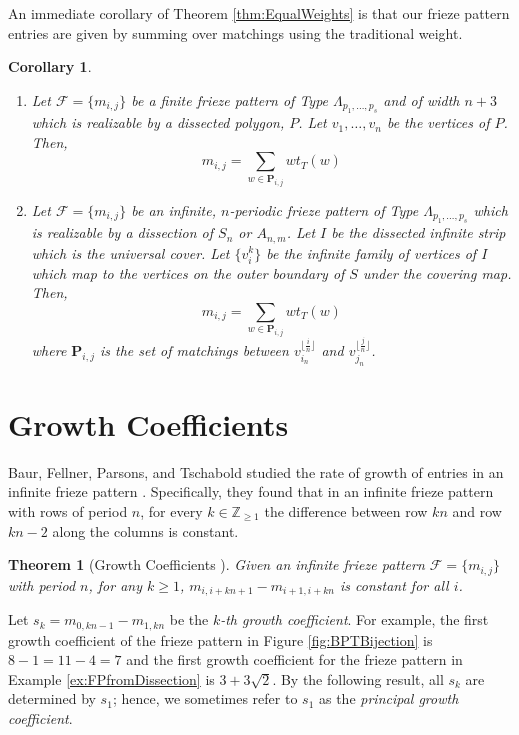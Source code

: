 \documentclass[12pt]{article}
\newtheorem{theorem}{Theorem}
\newtheorem{corollary}{Corollary}
\theoremstyle{remark}
\newcommand*{\pathset}[2]{\mathbf{P}_{#1,#2}}
\begin{document}
An immediate corollary of Theorem \ref{thm:EqualWeights} is that our frieze pattern entries are given by summing over matchings using the traditional weight.

\begin{corollary}\label{cor:TraditionalWeight}
\begin{enumerate}
    \item Let $\mathcal{F} = \{m_{i,j}\}$ be a finite frieze pattern of Type $\Lambda_{p_1,\ldots,p_s}$ and of width $n+3$ which is realizable by a dissected polygon, $P$. Let $v_1,\ldots,v_n$ be the vertices of $P$.  Then,\[
    m_{i,j} = \sum_{w \in \pathset{i}{j}} wt_T(w)
    \]
    \item Let $\mathcal{F} = \{m_{i,j}\}$ be an infinite, $n$-periodic frieze pattern of Type $\Lambda_{p_1,\ldots,p_s}$ which is realizable by a dissection of $S_n$ or $A_{n,m}$. Let $I$ be the dissected infinite strip which is the universal cover.  Let $\{v_i^k\}$ be the infinite family of vertices of $I$ which map to the vertices on the outer boundary of $S$ under the covering map. Then,\[
    m_{i,j} = \sum_{w \in \pathset{i}{j}} wt_T(w)
    \]
    where $\pathset{i}{j}$ is the set of matchings between $v_{i_n}^{\lfloor \frac{i}{n} \rfloor}$ and $v_{j_n}^{\lfloor \frac{j}{n} \rfloor}$.
\end{enumerate}
\end{corollary}

\section{Growth Coefficients}\label{sec:GrCo}

Baur, Fellner, Parsons, and Tschabold studied the rate of growth of entries in an infinite frieze pattern \cite{2}. Specifically, they found that in an infinite frieze pattern with rows of period $n$, for every $k \in \mathbb{Z}_{\geq 1}$ the difference between row $kn$ and row $kn - 2$ along the columns is constant. 

\begin{theorem}[Growth Coefficients \cite{2}] \label{thm:GrowthCoefficient}
Given an infinite frieze pattern $\mathcal{F} = \{m_{i,j}\}$ with period $n$, for any $k \geq 1$, $m_{i,i+kn + 1} - m_{i+1, i+kn}$ is constant for all $i$. 
\end{theorem}

Let $s_k = m_{0,kn-1} - m_{1,kn}$ be the \emph{$k$-th growth coefficient}. For example, the first growth coefficient of the frieze pattern in Figure \ref{fig:BPTBijection} is $8 -1 = 11 - 4 = 7$ and the first growth coefficient for the frieze pattern in Example \ref{ex:FPfromDissection} is $3 + 3\sqrt{2}$. By the following result, all $s_k$ are determined by  $s_1$; hence, we sometimes refer to $s_1$ as the \emph{principal growth coefficient}. 
\end{document}
